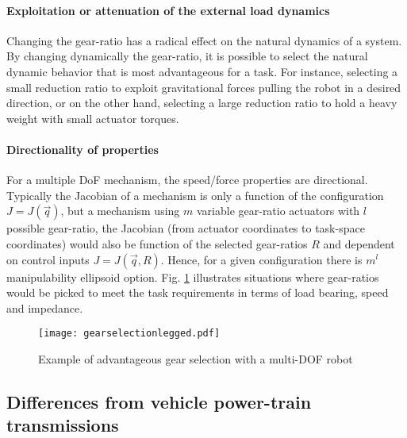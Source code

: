 \paragraph{Exploitation or attenuation of the external load dynamics}
Changing the gear-ratio has a radical effect on the natural dynamics of a system. By changing dynamically the gear-ratio, it is possible to select the natural dynamic behavior that is most advantageous for a task. For instance, selecting a small reduction ratio to exploit gravitational forces pulling the robot in a desired direction, or on the other hand, selecting a large reduction ratio to hold a heavy weight with small actuator torques.

\paragraph{Directionality of properties}
For a multiple DoF mechanism, the speed/force properties are directional. Typically the Jacobian of a mechanism is only a function of the configuration $J=J(\vec{q})$, but a mechanism using $m$ variable gear-ratio actuators with $l$ possible gear-ratio, the Jacobian (from actuator coordinates to task-space coordinates) would also be function of the selected gear-ratios $R$ and dependent on control inputs $J=J(\vec{q},R)$. Hence, for a given configuration there is $m^l$ manipulability ellipsoid option. Fig. \ref{fig:gearselectionlegged} illustrates situations where gear-ratios would be picked to meet the task requirements in terms of load bearing, speed and impedance. 


\begin{figure}[hb]
	\centering
		\texttt{[image: gearselectionlegged.pdf]}
	\caption{Example of advantageous gear selection with a multi-DOF robot}
	\label{fig:gearselectionlegged}
\end{figure}



\subsection{Differences from vehicle power-train transmissions}

